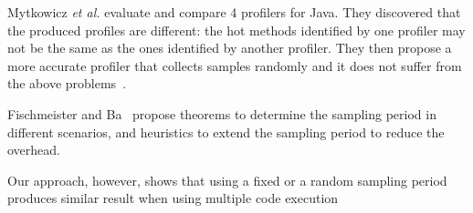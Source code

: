 \documentclass{sig-alternate}
\newcommand{\ab}[1]{\nb{Alexandre}{blue}{#1}}
\newcommand{\vp}[1]{\nb{Vanessa}{orange}{#1}}
\newcommand{\etal}{\emph{et al.}\xspace}
\begin{document}







Mytkowicz \etal evaluate and compare 4 profilers for Java. They discovered that the produced profiles are different: the hot methods identified by one profiler may not be the same as the ones identified by another profiler. They then propose a more accurate profiler that collects samples randomly and it does not suffer from the above problems~\cite{Mytk10a}. 

Fischmeister and Ba~\cite{Fisc10a} propose theorems to determine the sampling period in different scenarios, and heuristics to extend the sampling period to reduce the overhead.

Our approach, however, shows that using a fixed or a random sampling period produces similar result when using multiple code execution

\end{document}
